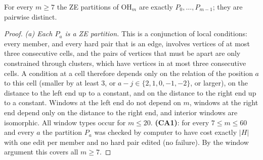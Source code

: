 \begin{lemma}\label{lem:hchain}
For every $m\ge7$ the ZE partitions of $\mathrm{OH}_m$ are exactly $P_0,\dots,P_{m-1}$; they are pairwise distinct.
\end{lemma}
\begin{proof}
\emph{(a) Each $P_a$ is a ZE partition.} This is a conjunction of local conditions: every member, and every hard pair that is an edge, involves vertices of at most three consecutive cells, and the pairs of vertices that must be apart are only constrained through clusters, which have vertices in at most three consecutive cells. A condition at a cell therefore depends only on the relation of the position $a$ to this cell (smaller by at least $3$, or $a-j\in\{2,1,0,-1,-2\}$, or larger), on the distance to the left end up to a constant, and on the distance to the right end up to a constant. Windows at the left end do not depend on $m$, windows at the right end depend only on the distance to the right end, and interior windows are isomorphic. All window types occur for $m\le 20$. \textbf{(CA1)}: for every $7\le m\le60$ and every $a$ the partition $P_a$ was checked by computer to have cost exactly $|H|$ with one edit per member and no hard pair edited (no failure). By the window argument this covers all $m\ge7$.


\end{proof}
